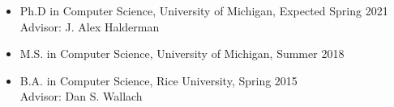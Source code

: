 \documentclass[11pt]{article}
\begin{document}
\begin{itemize}[label={--\ },leftmargin=0.25in,labelsep=0.1625em]\addtolength{\itemsep}{-0.25\baselineskip}

        \item Ph.D in Computer Science, University of Michigan, Expected Spring 2021\\
        Advisor: J. Alex Halderman
		
        \item M.S. in Computer Science, University of Michigan, Summer 2018

        \item B.A. in Computer Science, Rice University, Spring 2015\\
        Advisor: Dan S. Wallach
        
\end{itemize}




\end{document}
